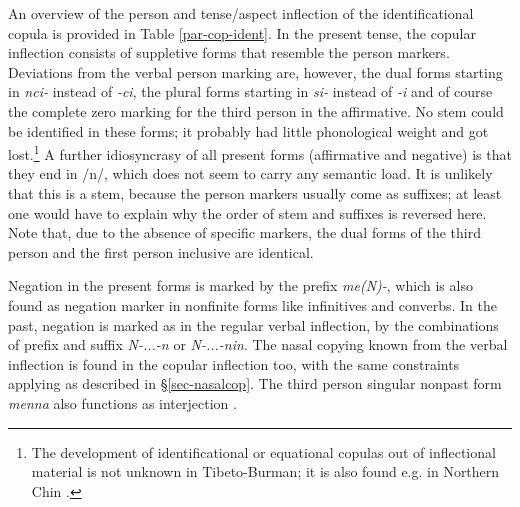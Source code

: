 An overview of the person and tense/aspect inflection of the identificational copula is provided in Table \ref{par-cop-ident}. In the present tense, the copular inflection consists of suppletive forms that resemble the person markers. Deviations from  the verbal person marking are, however, the dual forms starting in \emph{nci-} instead of \emph{-ci}, the plural forms starting in  \emph{si-} instead of  \emph{-i} and of course the complete zero marking for the third person in the affirmative. No stem could be identified in these forms; it probably had little phonological weight and got lost.\footnote{The development of identificational or equational copulas out of inflectional material is not unknown in Tibeto-Burman; it is also found e.g. in Northern Chin \cite[9]{DeLancey2011_Notes}.}  A further idiosyncrasy of all present forms (affirmative and negative) is that they end in /n/, which does not seem to carry any semantic load. It is unlikely that this is a stem, because the person markers usually come as suffixes; at least one would have to explain why the order of stem and suffixes is reversed here.  Note that, due to the absence of specific markers, the dual forms of the third person and the first person inclusive are identical.

Negation in the present forms is marked by the prefix \emph{me(N)-}, which is also found as negation marker in nonfinite forms like infinitives and converbs. In the past, negation is marked as in the regular verbal inflection, by the combinations of prefix and suffix \emph{N-...-n} or \emph{N-...-nin}. The nasal copying known from the verbal inflection is found in the copular inflection too, with the same constraints applying as described in §\ref{sec-nasalcop}. The third person singular nonpast form \emph{menna} also functions as interjection . 


